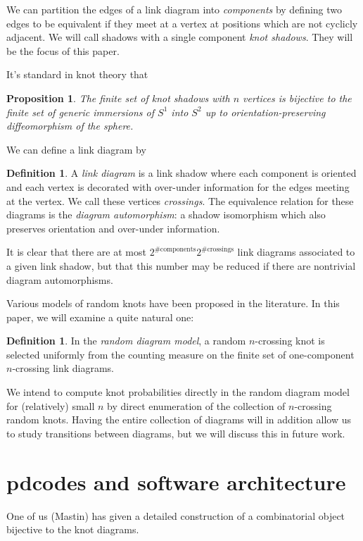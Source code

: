 \documentclass[amsmath,secnumarabic,floatfix,amssymb,nofootinbib,nobibnotes,letterpaper,11pt,tightenlines,showkeys]{revtex4}
\newtheorem{proposition}[theorem]{Proposition}
\theoremstyle{definition}
\newtheorem{definition}[theorem]{Definition}
\begin{document}
We can partition the edges of a link diagram into \emph{components} by defining two edges to be equivalent if they meet at a vertex at positions which are not cyclicly adjacent. We will call shadows with a single component \emph{knot shadows}. They will be the focus of this paper. 

It's standard in knot theory that
\begin{proposition}
The finite set of knot shadows with $n$ vertices is bijective to the finite set of generic immersions of $S^1$ into $S^2$ up to orientation-preserving diffeomorphism of the sphere.
\end{proposition}

We can define a link diagram by 
\begin{definition}
A \emph{link diagram} is a link shadow where each component is oriented and each vertex is decorated with over-under information for the edges meeting at the vertex. We call these vertices \emph{crossings}. The equivalence relation for these diagrams is the \emph{diagram automorphism}: a shadow isomorphism which also preserves orientation and over-under information. 
\end{definition}
It is clear that there are at most $2^{\text{\# components}} 2^{\text{\# crossings}}$ link diagrams associated to a given link shadow, but that this number may be reduced if there are nontrivial diagram automorphisms.

Various models of random knots have been proposed in the literature. In this paper, we will examine a quite natural one: 
\begin{definition}
In the \emph{random diagram model}, a random $n$-crossing knot is selected uniformly from the counting measure on the finite set of one-component $n$-crossing link diagrams.
\end{definition}
We intend to compute knot probabilities directly in the random diagram model for (relatively) small $n$ by direct enumeration of the collection of $n$-crossing random knots. Having the entire collection of diagrams will in addition allow us to study transitions between diagrams, but we will discuss this in future work. 

\section{pdcodes and software architecture}

One of us (Mastin) has given a detailed construction of a combinatorial object bijective to the knot diagrams.
\end{document}
